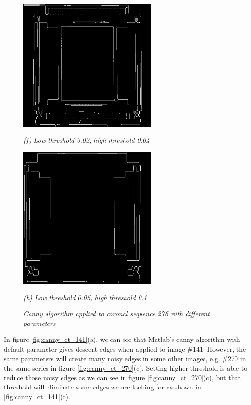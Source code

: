 \begin{figure}[htb]
  \begin{minipage}[t]{2.75in}
    \centering
    \centerline{\mbox{\includegraphics[width=2.75in]{data_extraction/images/canny/0.02_0.04/20121017_276.eps}}}
    \centerline{\emph{(f) Low threshold 0.02, high threshold  0.04}}
  \end{minipage}\medskip
  \begin{minipage}[t]{2.75in}
    \centering
    \centerline{\mbox{\includegraphics[width=2.75in]{data_extraction/images/canny/0.05_0.1/20121017_276.eps}}}
    \centerline{\emph{(h) Low threshold 0.05, high threshold  0.1}}
  \end{minipage}
  \caption{\emph{Canny algorithm applied to coronal sequence 276 with different parameters}} \label{fig:canny_ct_276}
\end{figure}

In figure \ref{fig:canny_ct_141}(a), we can see that Matlab's canny algorithm with default parameter gives 
descent edges when applied to image \#141. However, the same parameters will create many noisy edges in some other
images, e.g. \#270 in the same series in figure \ref{fig:canny_ct_270}(c). Setting higher threshold is able to
reduce those noisy edges as we can see in figure \ref{fig:canny_ct_270}(c), but that threshold will eliminate
some edges we are looking for as shown in \ref{fig:canny_ct_141}(c). 

